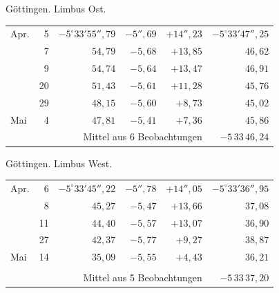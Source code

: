 \noindent\begin{minipage}[t]{.495\textwidth}\centering Göttingen. Limbus Ost.\par\smallskip
{\scriptsize\setlength{\tabcolsep}{1pt}\renewcommand{\arraystretch}{1.2}\begin{tabular}{lr|r|r|r|r|}
Apr.&5&$-5^\circ33'55''{,}79$&$-5''{,}69$&$+14''{,}23$&$-5^\circ33'47''{,}25$\\
&7&$54{,}79$&$-5{,}68$&$+13{,}85$&$46{,}62$\\
&9&$54{,}74$&$-5{,}64$&$+13{,}47$&$46{,}91$\\
&20&$51{,}43$&$-5{,}61$&$+11{,}28$&$45{,}76$\\
&29&$48{,}15$&$-5{,}60$&$+8{,}73$&$45{,}02$\\
Mai&4&$47{,}81$&$-5{,}41$&$+7{,}36$&$45{,}86$\\
\cline{6-6}\multicolumn{5}{r}{Mittel aus 6 Beobachtungen}&$-5\,33\,46{,}24$
\end{tabular}}\end{minipage}\hfill\begin{minipage}[t]{.495\textwidth}\centering Göttingen. Limbus West.\par\smallskip
{\scriptsize\setlength{\tabcolsep}{1pt}\renewcommand{\arraystretch}{1.2}\begin{tabular}{lr|r|r|r|r}
Apr.&6&$-5^\circ33'45''{,}22$&$-5''{,}78$&$+14''{,}05$&$-5^\circ33'36''{,}95$\\
&8&$45{,}27$&$-5{,}47$&$+13{,}66$&$37{,}08$\\
&11&$44{,}40$&$-5{,}57$&$+13{,}07$&$36{,}90$\\
&27&$42{,}37$&$-5{,}77$&$+9{,}27$&$38{,}87$\\
Mai&14&$35{,}09$&$-5{,}55$&$+4{,}43$&$36{,}21$\\
&&&&&\\
\cline{6-6}\multicolumn{5}{r}{Mittel aus 5 Beobachtungen}&$-5\,33\,37{,}20$
\end{tabular}}\end{minipage}
\par\vspace{4mm}


